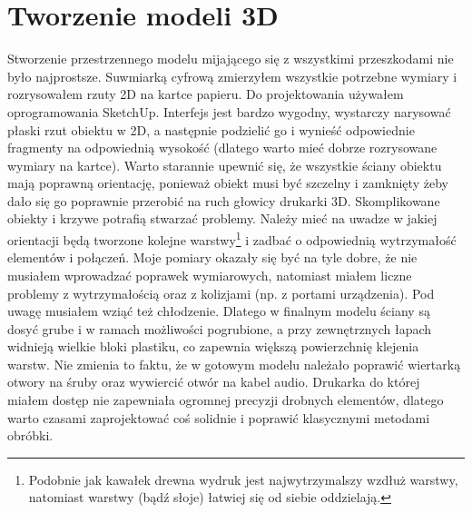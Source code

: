 \documentclass[declaration,shortabstract, inz]{iithesis}
\begin{document}
    
\section{Tworzenie modeli 3D}
\label{section:3d}
    Stworzenie przestrzennego modelu mijającego się z wszystkimi przeszkodami nie było najprostsze. Suwmiarką cyfrową zmierzyłem wszystkie potrzebne wymiary i rozrysowałem rzuty 2D na kartce papieru. Do projektowania używałem oprogramowania SketchUp. Interfejs jest bardzo wygodny, wystarczy narysować płaski rzut obiektu w 2D, a następnie podzielić go i wynieść odpowiednie fragmenty na odpowiednią wysokość (dlatego warto mieć dobrze rozrysowane wymiary na kartce). Warto starannie upewnić się, że wszystkie ściany obiektu mają poprawną orientację, ponieważ obiekt musi być szczelny i zamknięty żeby dało się go poprawnie przerobić na ruch głowicy drukarki 3D. Skomplikowane obiekty i krzywe potrafią stwarzać problemy. Należy mieć na uwadze w jakiej orientacji będą tworzone kolejne warstwy\footnote{Podobnie jak kawałek drewna wydruk jest najwytrzymalszy wzdłuż warstwy, natomiast warstwy (bądź słoje) łatwiej się od siebie oddzielają.} i zadbać o odpowiednią wytrzymałość elementów i połączeń. Moje pomiary okazały się być na tyle dobre, że nie musiałem wprowadzać poprawek wymiarowych, natomiast miałem liczne problemy z wytrzymałością oraz z kolizjami (np. z portami urządzenia). Pod uwagę musiałem wziąć też chłodzenie. Dlatego w finalnym modelu ściany są dosyć grube i w ramach możliwości pogrubione, a przy zewnętrznych łapach widnieją wielkie bloki plastiku, co zapewnia większą powierzchnię klejenia warstw. Nie zmienia to faktu, że w gotowym modelu należało poprawić wiertarką otwory na śruby oraz wywiercić otwór na kabel audio. Drukarka do której miałem dostęp nie zapewniała ogromnej precyzji drobnych elementów, dlatego warto czasami zaprojektować coś solidnie i poprawić klasycznymi metodami obróbki.
\end{document}
